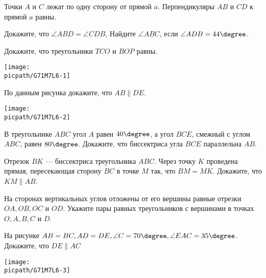 \begin{class}[number=6]
	\begin{listofex}
		\item Точки \(A\) и \(C\) лежат по одну сторону от прямой \(a\). Перпендикуляры \(AB\) и \(CD\) к прямой \(a\) равны. %
		\begin{tasks}
			\task Докажите, что \( \angle ABD = \angle CDB \),
			\task Найдите  \( \angle ABC \), если \( \angle ADB =44 \degree \).
		\end{tasks}
		\item 
		\begin{minipage}[t]{\bodywidth}
			Докажите, что треугольники \(TCO\) и \( BOP \) равны.
		\end{minipage}
		\hspace{0.02\linewidth}
		\begin{minipage}[t]{\picwidth}
			\texttt{[image: \\picpath/G71M7L6-1]}
		\end{minipage}
		\item %
		\begin{minipage}[t]{\bodywidth}
			По данным рисунка докажите, что \(AB \parallel DE\).
		\end{minipage}
		\hspace{0.02\linewidth}
		\begin{minipage}[t]{\picwidth}
			\texttt{[image: \\picpath/G71M7L6-2]}
		\end{minipage}
		\item В треугольнике \(ABC\) угол \(A\) равен \(40 \degree\), а угол \(BCE\), смежный с углом \(ABC\), равен \(80 \degree\). Докажите, что биссектриса угла \(BCE\) параллельна \(AB\). %
		
		\item Отрезок \(BK\) --- биссектриса треугольника \(ABC\). Через точку \(K\) проведена прямая, пересекающая сторону \(BC\) в точке \(M\) так, что \(BM=MK\). Докажите, что \(KM \parallel AB\). 
		\item На сторонах вертикальных углов отложены от его вершины равные отрезки \(OA, OB, OC\) и \(OD\). Укажите пары равных треугольников с вершинами в точках \(O, A, B, C\) и \(D\).
		\begin{minipage}[t]{\bodywidth}
			На рисунке \(AB=BC, AD=DE, \angle C = 70 \degree, \angle EAC = 35 \degree\). Докажите, что \(DE \parallel AC\)
		\end{minipage}
		\hspace{0.02\linewidth}
		\begin{minipage}[t]{\picwidth}
			\texttt{[image: \\picpath/G71M7L6-3]}
		\end{minipage}
	\end{listofex}
\end{class}

